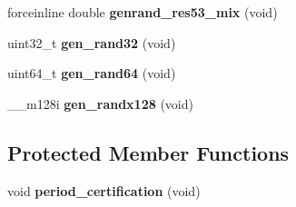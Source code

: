 \begin{DoxyCompactItemize}
\item 
\hypertarget{classsfmtplus_1_1sse2__fast__mersenne__twister_a6203068952363d6adb81ac2cd01e09b4}{
forceinline double {\bfseries genrand\-\_\-res53\-\_\-mix} (void)}
\label{classsfmtplus_1_1sse2__fast__mersenne__twister_a6203068952363d6adb81ac2cd01e09b4}

\item 
\hypertarget{classsfmtplus_1_1sse2__fast__mersenne__twister_aba0eb2154496e842ae117498c6262a7b}{
uint32\-\_\-t {\bfseries gen\-\_\-rand32} (void)}
\label{classsfmtplus_1_1sse2__fast__mersenne__twister_aba0eb2154496e842ae117498c6262a7b}

\item 
\hypertarget{classsfmtplus_1_1sse2__fast__mersenne__twister_a2f957fa7d919a55143c6a08150dfe582}{
uint64\-\_\-t {\bfseries gen\-\_\-rand64} (void)}
\label{classsfmtplus_1_1sse2__fast__mersenne__twister_a2f957fa7d919a55143c6a08150dfe582}

\item 
\hypertarget{classsfmtplus_1_1sse2__fast__mersenne__twister_aab7b1a5ee864ae25161903b532e33759}{
\-\_\-\-\_\-m128i {\bfseries gen\-\_\-randx128} (void)}
\label{classsfmtplus_1_1sse2__fast__mersenne__twister_aab7b1a5ee864ae25161903b532e33759}

\end{DoxyCompactItemize}
\subsection*{\-Protected \-Member \-Functions}
\begin{DoxyCompactItemize}
\item 
\hypertarget{classsfmtplus_1_1sse2__fast__mersenne__twister_a9040df9bdb5de831865a03a7b487f334}{
void {\bfseries period\-\_\-certification} (void)}
\label{classsfmtplus_1_1sse2__fast__mersenne__twister_a9040df9bdb5de831865a03a7b487f334}

\end{DoxyCompactItemize}

